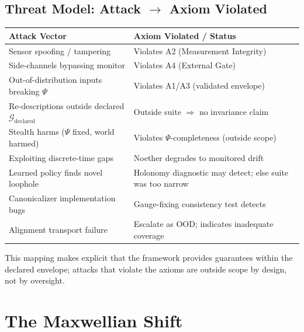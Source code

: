 \documentclass[12pt]{article}
\begin{document}
\subsection{Threat Model: Attack $\to$ Axiom Violated}

\begin{table}[h]
\centering
\begin{tabular}{ll}
\toprule
\textbf{Attack Vector} & \textbf{Axiom Violated / Status} \\
\midrule
Sensor spoofing / tampering & Violates A2 (Measurement Integrity) \\
Side-channels bypassing monitor & Violates A4 (External Gate) \\
Out-of-distribution inputs breaking $\Psi$ & Violates A1/A3 (validated envelope) \\
Re-descriptions outside declared $\mathcal{G}_{\text{declared}}$ & Outside suite $\Rightarrow$ no invariance claim \\
Stealth harms ($\Psi$ fixed, world harmed) & Violates $\Psi$-completeness (outside scope) \\
Exploiting discrete-time gaps & Noether degrades to monitored drift \\
Learned policy finds novel loophole & Holonomy diagnostic may detect; else suite was too narrow \\
Canonicalizer implementation bugs & Gauge-fixing consistency test detects \\
Alignment transport failure & Escalate as OOD; indicates inadequate coverage \\
\bottomrule
\end{tabular}
\end{table}

This mapping makes explicit that the framework provides guarantees within the declared envelope; attacks that violate the axioms are outside scope by design, not by oversight.

\section{The Maxwellian Shift}
\end{document}
